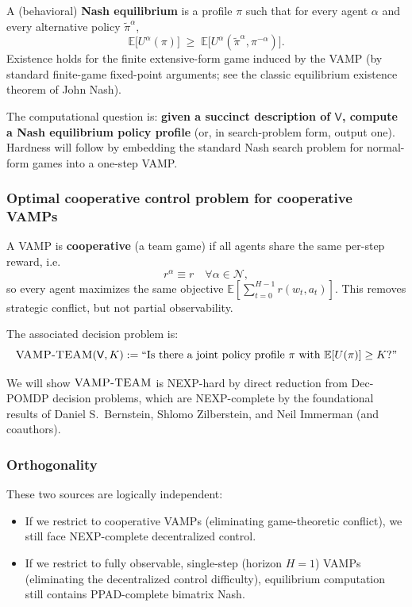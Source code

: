 A (behavioral) \textbf{Nash equilibrium} is a profile \(\pi\) such that for every agent \(\alpha\) and every alternative policy \(\tilde\pi^\alpha\),
\[
\mathbb E\big[U^\alpha(\pi)\big] \;\ge\; \mathbb E\big[U^\alpha(\tilde\pi^\alpha,\pi^{-\alpha})\big].
\]
Existence holds for the finite extensive-form game induced by the VAMP (by standard finite-game fixed-point arguments; see the classic equilibrium existence theorem of John Nash).

The computational question is: \textbf{given a succinct description of \(\mathsf V\), compute a Nash equilibrium policy profile} (or, in search-problem form, output one). Hardness will follow by embedding the standard Nash search problem for normal-form games into a one-step VAMP.

\subsubsection{Optimal cooperative control problem for cooperative VAMPs}

A VAMP is \textbf{cooperative} (a team game) if all agents share the same per-step reward, i.e.
\[
r^\alpha \equiv r \quad\forall \alpha\in\mathcal N,
\]
so every agent maximizes the same objective \(\mathbb E[\sum_{t=0}^{H-1} r(w_t,a_t)]\). This removes strategic conflict, but not partial observability.

The associated decision problem is:
\[
\textsc{VAMP-TEAM}( \mathsf V, K) := \text{``Is there a joint policy profile } \pi \text{ with } \mathbb E[U(\pi)] \ge K\text{?''}
\]

We will show \(\textsc{VAMP-TEAM}\) is NEXP-hard by direct reduction from Dec-POMDP decision problems, which are NEXP-complete by the foundational results of Daniel S.\ Bernstein, Shlomo Zilberstein, and Neil Immerman (and coauthors).

\subsubsection{Orthogonality}

These two sources are logically independent:
\begin{itemize}
\item If we restrict to cooperative VAMPs (eliminating game-theoretic conflict), we still face NEXP-complete decentralized control.
\item If we restrict to fully observable, single-step (horizon \(H=1\)) VAMPs (eliminating the decentralized control difficulty), equilibrium computation still contains PPAD-complete bimatrix Nash.
\end{itemize}

